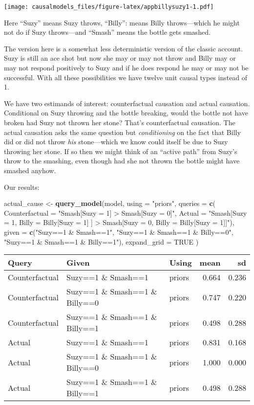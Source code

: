 \documentclass[
  12pt,
]{book}
\newenvironment{Shaded}{\begin{snugshade}}{\end{snugshade}}
\newcommand{\DataTypeTok}[1]{\textcolor[rgb]{0.13,0.29,0.53}{#1}}
\newcommand{\KeywordTok}[1]{\textcolor[rgb]{0.13,0.29,0.53}{\textbf{#1}}}
\newcommand{\NormalTok}[1]{#1}
\newcommand{\OtherTok}[1]{\textcolor[rgb]{0.56,0.35,0.01}{#1}}
\newcommand{\StringTok}[1]{\textcolor[rgb]{0.31,0.60,0.02}{#1}}
\begin{document}
\texttt{[image: causalmodels\_files/figure-latex/appbillysuzy1-1.pdf]}

Here ``Suzy'' means Suzy throws, ``Billy'': means Billy throws---which he might not do if Suzy throws---and ``Smash'' means the bottle gets smashed.

The version here is a somewhat less deterministic version of the classic account. Suzy is still an ace shot but now she may or may not throw and Billy may or may not respond positively to Suzy and if he does respond he may or may not be successful. With all these possibilities we have twelve unit causal types instead of 1.

We have two estimands of interest: counterfactual causation and actual causation. Conditional on Suzy throwing and the bottle breaking, would the bottle not have broken had Suzy not thrown her stone? That's counterfactual causation. The actual causation asks the same question but \emph{conditioning} on the fact that Billy did or did not throw \emph{his} stone---which we know could itself be due to Suzy throwing her stone. If so then we might think of an ``active path'' from Suzy's throw to the smashing, even though had she not thrown the bottle might have smashed anyhow.

Our results:

\begin{Shaded}
\begin{Highlighting}[]
\NormalTok{actual_cause <-}\StringTok{ }\KeywordTok{query_model}\NormalTok{(model, }\DataTypeTok{using =} \StringTok{"priors"}\NormalTok{,}
  \DataTypeTok{queries =} \KeywordTok{c}\NormalTok{(}
    \DataTypeTok{Counterfactual =} \StringTok{"Smash[Suzy = 1] > Smash[Suzy = 0]"}\NormalTok{,}
    \DataTypeTok{Actual =} \StringTok{"Smash[Suzy = 1, Billy = Billy[Suzy = 1] ] > }
\StringTok{              Smash[Suzy = 0, Billy = Billy[Suzy = 1]]"}\NormalTok{),}
  \DataTypeTok{given =} \KeywordTok{c}\NormalTok{(}\StringTok{"Suzy==1 & Smash==1"}\NormalTok{, }\StringTok{"Suzy==1 & Smash==1 & Billy==0"}\NormalTok{, }\StringTok{"Suzy==1 & Smash==1 & Billy==1"}\NormalTok{),}
  \DataTypeTok{expand_grid =} \OtherTok{TRUE}
\NormalTok{  )}
\end{Highlighting}
\end{Shaded}

\begin{tabular}{l|l|l|r|r}
\hline
Query & Given & Using & mean & sd\\
\hline
Counterfactual & Suzy==1 \& Smash==1 & priors & 0.664 & 0.236\\
\hline
Counterfactual & Suzy==1 \& Smash==1 \& Billy==0 & priors & 0.747 & 0.220\\
\hline
Counterfactual & Suzy==1 \& Smash==1 \& Billy==1 & priors & 0.498 & 0.288\\
\hline
Actual & Suzy==1 \& Smash==1 & priors & 0.831 & 0.168\\
\hline
Actual & Suzy==1 \& Smash==1 \& Billy==0 & priors & 1.000 & 0.000\\
\hline
Actual & Suzy==1 \& Smash==1 \& Billy==1 & priors & 0.498 & 0.288\\
\hline
\end{tabular}
\end{document}
